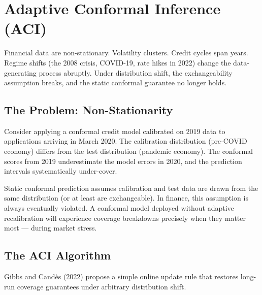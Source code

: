 \documentclass[11pt, a4paper]{article}
\theoremstyle{definition}
\theoremstyle{plain}
\theoremstyle{remark}
\begin{document}
\section{Adaptive Conformal Inference (ACI)}
\label{sec:aci}

Financial data are non-stationary.
Volatility clusters.
Credit cycles span years.
Regime shifts (the 2008 crisis, COVID-19, rate hikes in 2022) change the
data-generating process abruptly.
Under distribution shift, the exchangeability assumption breaks, and the static
conformal guarantee no longer holds.

\subsection{The Problem: Non-Stationarity}

Consider applying a conformal credit model calibrated on 2019 data to applications
arriving in March 2020.
The calibration distribution (pre-COVID economy) differs from the test distribution
(pandemic economy).
The conformal scores from 2019 underestimate the model errors in 2020, and the
prediction intervals systematically under-cover.

\begin{warningbox}
Static conformal prediction assumes calibration and test data are drawn from the
same distribution (or at least are exchangeable).
In finance, this assumption is always eventually violated.
A conformal model deployed without adaptive recalibration will experience
coverage breakdowns precisely when they matter most --- during market stress.
\end{warningbox}

\subsection{The ACI Algorithm}

Gibbs and Cand\`{e}s (2022) propose a simple online update rule that restores
long-run coverage guarantees under arbitrary distribution shift.
\end{document}
